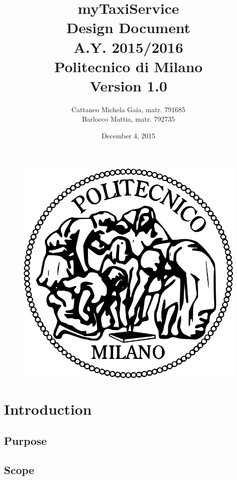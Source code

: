\documentclass[18pt,oneside,a4paper, titlepage]{article}
\begin{document}
\begin{figure}[t]
	\centering
	\includegraphics[scale=0.35]{logo-polimi.png}
\end{figure}
\title{\textbf{myTaxiService}\\\textbf{D}esign \textbf{D}ocument\\ A.Y. 2015/2016\\
	Politecnico di Milano \\ Version 1.0}	
\author{Cattaneo Michela Gaia, matr. 791685\\Barlocco Mattia, matr. 792735 }
\date{December 4, 2015}
\maketitle

\newpage
	\tableofcontents

\newpage
	\section{Introduction}
		\subsection{Purpose}
		\subsection{Scope}
\end{document}

